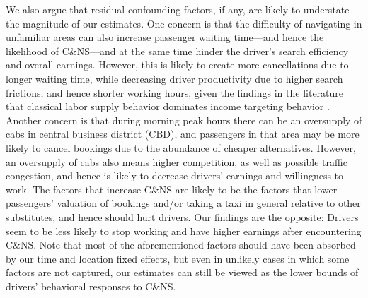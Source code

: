 \documentclass[reviewmode,AEJ]{AEA}
\begin{document}
We also argue that residual confounding factors, if any, are likely to understate the magnitude of our estimates.
One concern is that the difficulty of navigating in unfamiliar areas can also increase passenger waiting time---and 
hence the likelihood of C\&NS---and at the same time hinder the driver's search efficiency and overall earnings. 
However, this is likely to create more cancellations due to longer waiting time, while decreasing driver 
productivity due to higher search frictions, and hence shorter working hours, given the findings in the 
literature that classical labor supply behavior dominates income targeting behavior \citep{farber2015you}.
Another concern is that during morning peak hours there can be an oversupply of cabs in central business 
district (CBD), and passengers in that area may be more likely to cancel bookings due to the abundance of
cheaper alternatives. However, an oversupply of cabs also means higher competition, as well as possible
traffic congestion, and hence is likely to decrease drivers' earnings and willingness to work.  
The factors that increase C\&NS are likely to be the factors that lower passengers' valuation of bookings
and/or taking a taxi in general relative to other substitutes, and hence should hurt drivers.
Our findings are the opposite: Drivers seem to be less likely to stop working and have higher earnings after 
encountering C\&NS. Note that most of the aforementioned factors should have been absorbed by our
time and location fixed effects, but even in unlikely cases in which some factors are not captured, 
our estimates can still be viewed as the lower bounds of drivers' behavioral responses to C\&NS.

\end{document}
